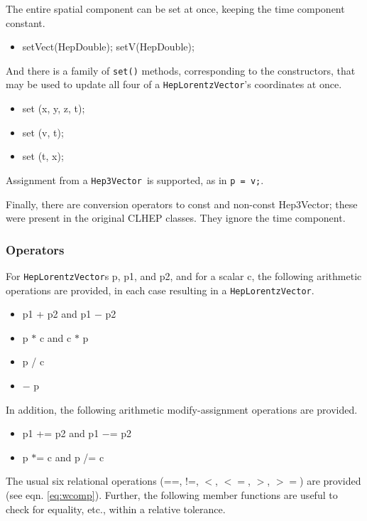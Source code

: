 \documentclass[twoside,12pt]{article}
\def \SV {{\tt Hep3Vector}}
\def \LV {{\tt HepLorentzVector}}
\newenvironment{shortlist}{%
\begin{itemize}
\setlength{\itemsep}{0pt}
\setlength{\parskip}{0pt}
}{%
\end{itemize}
}
\begin{document}
The entire spatial component can be set at once, keeping the time component 
constant.

\begin{shortlist}
  \item setVect(HepDouble);  \/\/\/ setV(HepDouble);  
\end{shortlist}

\noindent
And there is a family of {\tt set()} methods, corresponding to the 
constructors,
that may be used to update all four of a \LV 's coordinates at once.
\begin{shortlist}
  \item set (x, y, z, t);
  \item set (v, t);
  \item set (t, x);
\end{shortlist}

\noindent
Assignment from a \SV\ is supported, as in \verb|p = v;|.

\noindent
Finally, there are conversion operators to const and non-const Hep3Vector;
these were present in the original CLHEP classes.  
They ignore the time component.

\subsubsection{Operators}

For \LV s p, p1, and p2, and for a scalar c,
the following arithmetic operations are provided,
in each case resulting in a \LV .

\begin{shortlist}
  \item p1 + p2  and  p1 $-$ p2
  \item p $*$ c  and  c $*$ p
  \item p / c
  \item $-$ p
\end{shortlist}

\noindent
In addition, the following arithmetic modify-assignment operations are provided.

\begin{shortlist}
  \item p1 += p2  and  p1 $-$= p2
  \item p $*$= c  and  p /= c
\end{shortlist}

The usual six relational operations
(==, !=, $<$, $<=$, $>$, $>=$) are provided (see eqn. \ref{eq:wcomp}).
Further, the following member functions are useful
to check for equality, etc., within a relative tolerance.
\end{document}
